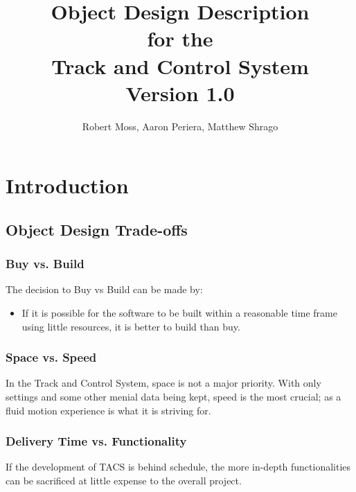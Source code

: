 \documentclass[titlepage]{article}
\begin{document}
\title{
\textbf{
Object Design Description}
\protect\\
for the
\protect\\
\textbf{
Track and Control System}
\protect\\
{\small Version 1.0}}

\author{Robert Moss, Aaron Periera, Matthew Shrago}
\maketitle

\newpage
\tableofcontents{} 
\newpage

\section{Introduction}

\subsection{Object Design Trade-offs}

\subsubsection{Buy vs. Build}

\item The decision to Buy vs Build can be made by:
\begin{itemize}	 	 	
  	\item If it is possible for the software to be built within a reasonable time frame using little resources, it is better to build than buy.  	
	\end{itemize}
	

\subsubsection{Space vs. Speed}

\item In the Track and Control System, space is not a major priority. With only settings and some other menial data being kept, speed is the most crucial; as a fluid motion experience is what it is striving for. 

\subsubsection{Delivery Time vs. Functionality}
\item If the development of TACS is behind schedule, the more in-depth functionalities can be sacrificed at little expense to the overall project.
\end{document}
